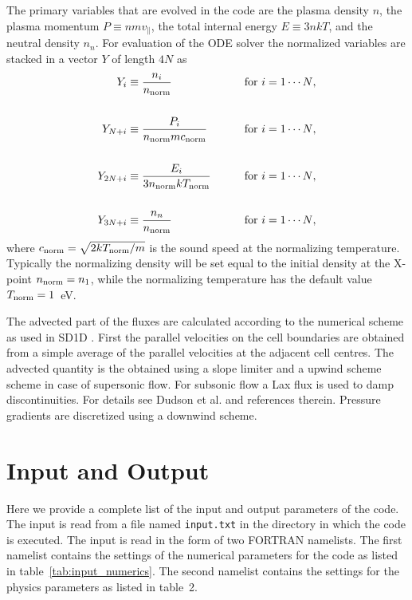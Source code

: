 \documentclass[amsmath,amssymb,a4]{revtex4-2}
\begin{document}
The primary variables that are evolved in the code are the plasma density $n$, the plasma momentum $P \equiv n m v_\parallel$, the total internal energy $E \equiv 3 n k T$, and the neutral density $n_n$. For evaluation of the ODE solver the normalized variables are stacked in a vector $Y$ of length $4N$ as
\begin{eqnarray}
    Y_i        &\equiv {\displaystyle n_i \over n_{\rm norm} } &\quad\quad\hbox{for $i = 1 \cdots N$}, \nonumber \\ \nonumber \\
    Y_{N + i}  &\equiv {\displaystyle P_i \over n_{\rm norm} m c_{\rm norm} } &\quad\quad\hbox{for $i = 1 \cdots N$}, \nonumber \\ \label{solution_vector} \\
    Y_{2N + i} &\equiv {\displaystyle E_i \over 3 n_{\rm norm} k T_{\rm norm} } &\quad\quad\hbox{for $i = 1 \cdots N$},  \nonumber\\ \nonumber \\
    Y_{3N + i} &\equiv {\displaystyle n_n \over n_{\rm norm} } &\quad\quad\hbox{for $i = 1 \cdots N$}, \nonumber
\end{eqnarray}
where $c_{\rm norm} = \sqrt{2 k T_{\rm norm}/m}$ is the sound speed at the normalizing temperature. Typically the normalizing density will be set equal to the initial density at the X-point $n_{\rm norm} = n_1$, while the normalizing temperature has the default value $T_{\rm norm} = 1$~eV.

The advected part of the fluxes are calculated according to the numerical scheme as used in SD1D \cite{SD1D}. First the parallel velocities on the cell boundaries are obtained from a simple average of the parallel velocities at the adjacent cell centres. The advected quantity is the obtained using a slope limiter and a upwind scheme scheme in case of supersonic flow. For subsonic flow a Lax flux is used to damp discontinuities. For details see Dudson et al. \cite{dudson2019} and references therein. Pressure gradients are discretized using a downwind scheme.


\section{Input and Output}\label{IO}

Here we provide a complete list of the input and output parameters of the code. The input is read from a file named {\tt input.txt} in the directory in which the code is executed. The input is read in the form of two FORTRAN namelists. The first namelist contains the settings of the numerical parameters for the code as listed in table~\ref{tab:input_numerics}. The second namelist contains the settings for the physics parameters as listed in table~2.
\end{document}
